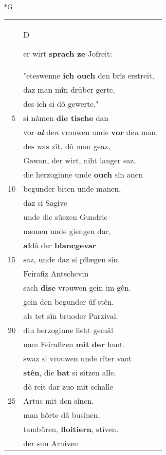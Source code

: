 \documentclass[8pt,a4paper,notitlepage]{article}
\begin{document}
\begin{table}[ht]
\begin{minipage}[t]{0.5\linewidth}
\small
\begin{center}*G
\end{center}
\begin{tabular}{rl}
 & \begin{large}D\end{large}er wirt \textbf{sprach ze} Jofreit:\\ 
 & "eteswenne \textbf{ich ouch} den brîs erstreit,\\ 
 & daz man mîn drüber gerte,\\ 
 & des ich si dô gewerte."\\ 
5 & si nâmen \textbf{die tische} dan\\ 
 & vor \textit{\textbf{al}} de\textit{n} vrouwen unde \textbf{vor} de\textit{n} man.\\ 
 & des was zît. dô man geaz,\\ 
 & Gawan, der wirt, niht langer saz.\\ 
 & die herzoginne unde \textbf{ouch} sîn anen\\ 
10 & begunder biten unde manen,\\ 
 & daz si Sagive\\ 
 & unde die süezen Gundrie\\ 
 & næmen unde giengen dar,\\ 
 & \textbf{al}dâ der \textbf{blancgevar}\\ 
15 & saz, unde daz si pflægen sîn.\\ 
 & Feirafiz Antschevin\\ 
 & sach \textbf{dise} vrouwen gein im gên.\\ 
 & gein den begunder ûf stên.\\ 
 & als tet sîn bruoder Parzival.\\ 
20 & diu herzoginne lieht gemâl\\ 
 & nam Feirafizen \textbf{mit} \textbf{der} hant.\\ 
 & swaz si vrouwen unde rîter vant\\ 
 & \textbf{stên}, die \textbf{bat} si sitzen alle.\\ 
 & dô reit dar zuo mit schalle\\ 
25 & Artus mit den sînen.\\ 
 & man hôrte dâ busînen,\\ 
 & tambûren, \textbf{floitiern}, stîven.\\ 
 & der sun Arniven\\ 

\end{tabular}
\end{minipage}
\end{table}
\end{document}
